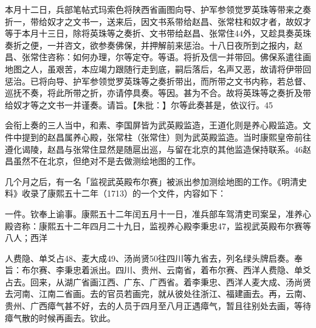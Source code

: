 \begin{BookQuote}
本月十二日，兵部笔帖式玛索色将陕西省画图向导、护军参领觉罗英珠等带来之奏折一，带给奴才之文书一，送来后，因文书系带给赵昌、张常柱和奴才者，故奴才等于本月十三日，除将英珠等之奏折、文书带给赵昌、张常住44外，又趁具奏英珠奏折之便，一并咨文，欲参奏佛保，并押解前来惩治。十八日夜所到之报内，赵昌、张常住咨称：如何办理，尔等定夺。等语。将折及信一并带回。佛保系遣往画地图之人，虽艰苦，本应竭力跟随行走到底，嗣后落后，名声又恶，故请将伊带回惩治。已将向导、护军参领觉罗英珠等之奏折带出，而所带之文书内称，若总督、巡抚不奏，将此所带之折，亦请停具奏。等因。甚为不合。故将英珠等之奏折及带给奴才等之文书一并谨奏。请旨。【朱批：】尔等此奏甚是，依议行。45
\end{BookQuote}

会衔上奏的三人当中，和素、李国屏皆为武英殿监造，王道化则是养心殿监造。文件中提到的赵昌属养心殿，张常柱（张常住）则为武英殿监造。当时康熙皇帝前往遵化谒陵，赵昌与张常住显然是随扈出巡，与留在北京的其他监造保持联系。46赵昌虽然不在北京，但绝对不是去做测绘地图的工作。

几个月之后，有一名「监视武英殿布尔赛」被派出参加测绘地图的工作。《明清史料》收录了康熙五十二年（1713）的一个文件，内容如下：

\begin{BookQuote}
一件。钦奉上谕事。康熙五十二年闰五月十一日，准兵部车驾清吏司案呈，准养心殿咨称：康熙五十二年四月二十九日，监视养心殿李秉忠47，监视武英殿布尔赛等八人；西洋
\end{BookQuote}

\vfill
\begin{BookNotes}
\end{BookNotes}

人费隐、单爻占48、麦大成49、汤尚贤50往四川等九省去，列名绿头牌启奏。奉旨：布尔赛、李秉忠着派出。四川、贵州、云南省，着布尔赛、西洋人费隐、单爻占去。回来，从湖广省画江西、广东、广西省。着李秉忠、西洋人麦大成、汤尚贤去河南、江南二省画。去的官员若画完，就从彼处往浙江、福建画去。再，云南、贵州、广西瘴气甚不好，去的人员于四月至八月正遇瘴气，暂且往别处去画，等待瘴气散的时候再画去。钦此。

